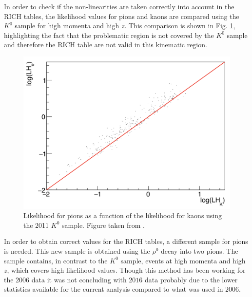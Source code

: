 In order to check if the non-linearities are taken correctly into account in the RICH tables, the likelihood values for pions and kaons are compared using the $K^0$ sample for high momenta and high $z$. This comparison is shown in Fig. \ref{pic:K0sample}, highlighting the fact that the problematic region is not covered by the $K^0$ sample and therefore the RICH table are not valid in this kinematic region.

\begin{figure}[!h]
  \centering
	\includegraphics[scale=0.4]{./gfx/K0sample.png}
	\caption{Likelihood for pions as a function of the likelihood for kaons using the 2011 $K^0$ sample. Figure taken from \cite{RICHnote}.}
	\label{pic:K0sample}
\end{figure}

In order to obtain correct values for the RICH tables, a different sample for pions is needed. This new sample is obtained using the $\rho^0$ decay into two pions. The sample contains, in contrast to the $K^0$ sample, events at high momenta and high $z$, which covers high likelihood values. Though this method has been working for the $2006$ data it was not concluding with $2016$ data probably due to the lower statistics available for the current analysis compared to what was used in $2006$.

